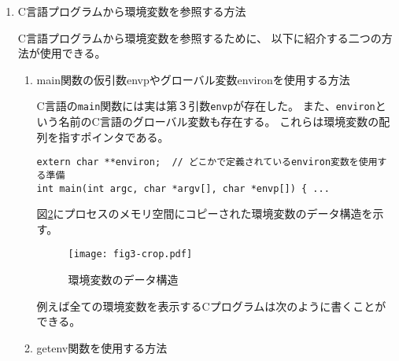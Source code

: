 \documentclass[a4j,dvipdfmx]{jarticle}
\begin{document}
\begin{enumerate}
この仕組みはシェルに限らず全ての{\bf 他のプログラムを起動するプログラム}で
用いられる仕組みである。
実は上記の「環境変数の操作」で紹介した
\verb/env/コマンドだけは{\bf 外部コマンド}である。
\verb/env/コマンドは{\bf 他のプログラムを起動するプログラム}として実装できる。

図\ref{fig2}に\verb/env/コマンドの仕組みを示す。
\verb/env/コマンドは自身の環境変数を変更した後、
目的のコマンドを起動する。
(本当はもう少し効率的な実装が可能である。詳しくは後日、紹介する。)

\begin{figure}[hbtp]
  \begin{center} %
    \texttt{[image: fig2-crop.pdf]}
    \caption{env プログラムの仕組み}
    \label{fig2}
  \end{center}
\end{figure}

\item C言語プログラムから環境変数を参照する方法

C言語プログラムから環境変数を参照するために、
以下に紹介する二つの方法が使用できる。

\begin{enumerate}
\item main関数の仮引数envpやグローバル変数environを使用する方法

C言語の\verb/main/関数には実は第３引数\verb/envp/が存在した。
また、\verb/environ/という名前のC言語のグローバル変数も存在する。
これらは環境変数の配列を指すポインタである。

\begin{lstlisting}[numbers=none]
extern char **environ;  // どこかで定義されているenviron変数を使用する準備
int main(int argc, char *argv[], char *envp[]) { ...
\end{lstlisting}

図\ref{fig3}にプロセスのメモリ空間にコピーされた環境変数のデータ構造を示す。

\begin{figure}[tbph]
  \begin{center} %
    \texttt{[image: fig3-crop.pdf]}
    \caption{環境変数のデータ構造}
    \label{fig3}
  \end{center}
\end{figure}

例えば全ての環境変数を表示するCプログラムは次のように書くことができる。



\item getenv関数を使用する方法


\end{enumerate}
\end{enumerate}
\end{document}
